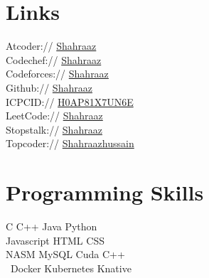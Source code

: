 \documentclass[]{deedy-resume-openfont}
\begin{document}
\begin{minipage}[t]{0.33\textwidth}



\section{Links} 
Atcoder:// \href{https://atcoder.jp/users/shahraaz}{ Shahraaz} \\ 
Codechef:// \href{https://www.codechef.com/users/shahraaz}{ Shahraaz} \\ 
Codeforces:// \href{https://codeforces.com/profile/shahraaz}{ Shahraaz} \\ 
Github:// \href{https://github.com/Shahraaz}{ Shahraaz} \\
ICPCID://  \href{https://icpc.global/ICPCID/H0AP81X7UN6E}{ H0AP81X7UN6E} \\
LeetCode:// \href{https://leetcode.com/shahraaz/}{ Shahraaz} \\ 
Stopstalk:// \href{https://www.stopstalk.com/user/profile/Shahraaz}{ Shahraaz} \\ 
Topcoder:// \href{https://www.topcoder.com/members/shahraazhussain}{ Shahraazhussain} \\ 



\section{Programming Skills}
C \textbullet{} C++ \textbullet{} Java \textbullet{}  Python \\ 
Javascript \textbullet{} HTML \textbullet{} CSS\\
NASM \textbullet{} MySQL \textbullet{} Cuda C++ \\\
Docker \textbullet{} Kubernetes \textbullet{} Knative\\ 
\sectionsep



\end{minipage}
\end{document}
